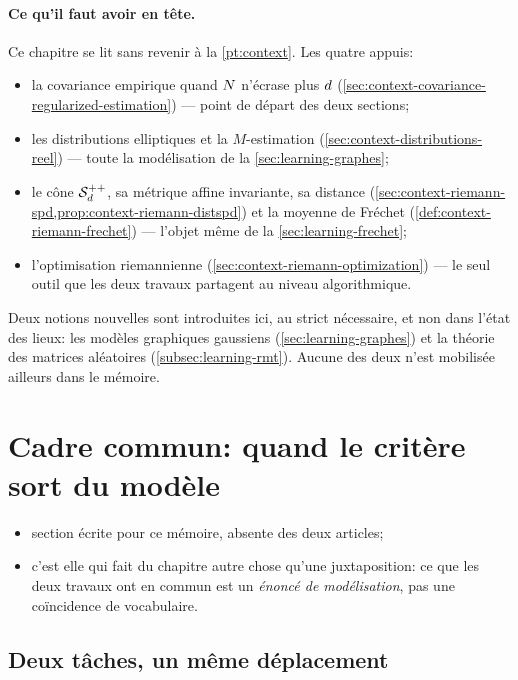 \paragraph{Ce qu'il faut avoir en tête.} Ce chapitre se lit sans revenir à la
\cref{pt:context}. Les quatre appuis:
\begin{itemize}
  \item la covariance empirique quand $N$ n'écrase plus $d$
    (\cref{sec:context-covariance-regularized-estimation}) --- point de départ
    des deux sections;
  \item les distributions elliptiques et la $M$-estimation
    (\cref{sec:context-distributions-reel}) --- toute la modélisation de la
    \cref{sec:learning-graphes};
  \item le cône $\mathcal{S}_{d}^{++}$, sa métrique affine invariante, sa distance
    (\cref{sec:context-riemann-spd,prop:context-riemann-distspd}) et la
    moyenne de Fréchet (\cref{def:context-riemann-frechet}) --- l'objet même
    de la \cref{sec:learning-frechet};
  \item l'optimisation riemannienne
    (\cref{sec:context-riemann-optimization}) --- le seul outil que les deux
    travaux partagent au niveau algorithmique.
\end{itemize}

Deux notions nouvelles sont introduites ici, au strict nécessaire, et non dans
l'état des lieux: les modèles graphiques gaussiens
(\cref{sec:learning-graphes}) et la théorie des matrices aléatoires
(\cref{subsec:learning-rmt}). Aucune des deux n'est mobilisée ailleurs dans le
mémoire.

\section{Cadre commun: quand le critère sort du modèle}
\label{sec:learning-cadre}

\begin{itemize}
  \item section écrite pour ce mémoire, absente des deux articles;
  \item c'est elle qui fait du chapitre autre chose qu'une juxtaposition: ce
    que les deux travaux ont en commun est un \emph{énoncé de modélisation},
    pas une coïncidence de vocabulaire.
\end{itemize}

\subsection{Deux tâches, un même déplacement}
\label{subsec:learning-taches}

